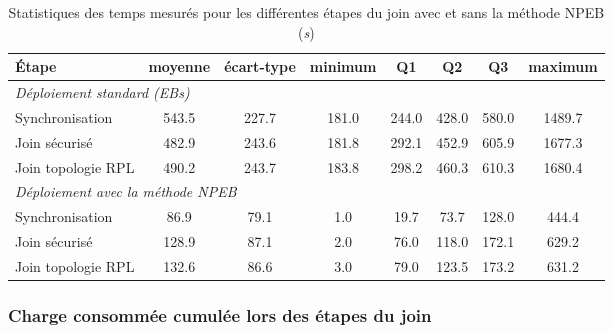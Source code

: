 \documentclass[]{report}
\begin{document}
\begin{table}[h]
\centering
\begin{tabular}{|l|c|c|c|c|c|c|c|}
	\hline
    \textbf{\textbf{Étape}} & moyenne & écart-type & minimum & Q1 & Q2 & Q3 & maximum\\
    \hline
    \multicolumn{8}{|l|}{\textit{Déploiement standard (EBs)}}\\  
    \hline
    Synchronisation & 543.5 & 227.7 & 181.0 & 244.0 & 428.0 & 580.0 & 1489.7 \\
    \hline
    Join sécurisé & 482.9 & 243.6 & 181.8 & 292.1 & 452.9 & 605.9 & 1677.3 \\
    \hline
    Join topologie RPL & 490.2 & 243.7 & 183.8 & 298.2 & 460.3 & 610.3 & 1680.4 \\
    \hline
    \multicolumn{8}{|l|}{\textit{Déploiement avec la méthode NPEB}}\\    
    \hline
    Synchronisation & 86.9 & 79.1 & 1.0 & 19.7 & 73.7 & 128.0 & 444.4 \\
    \hline
    Join sécurisé & 128.9 & 87.1 & 2.0 & 76.0 & 118.0 & 172.1 & 629.2 \\
    \hline
    Join topologie RPL & 132.6 & 86.6 & 3.0 & 79.0 & 123.5 & 173.2 & 631.2 \\
    \hline
\end{tabular}
\caption{Statistiques des temps mesurés pour les différentes étapes du join avec et sans la méthode NPEB (\textit{s})}
\label{table_times}
\end{table}



\subsubsection{Charge consommée cumulée lors des étapes du join}
\end{document}
